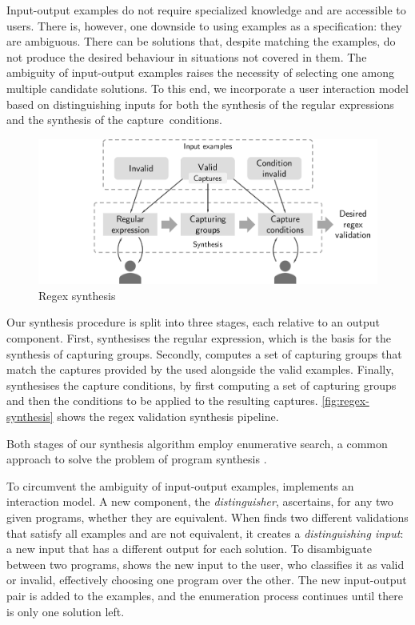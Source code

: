 Input-output examples do not require specialized knowledge and are accessible to users.
There is, however, one downside to using examples as a specification: they are ambiguous. There can be solutions that, despite matching the examples, do not produce the desired behaviour in situations not covered in them.
The ambiguity of input-output examples raises the necessity of selecting one among multiple candidate solutions.
%
To this end, we incorporate a user interaction model based on distinguishing inputs
for both the synthesis of the regular expressions and the synthesis of the capture~conditions. 

\begin{figure}
    \centering
    \includegraphics[scale=.35]{pictures/regex_synthesis_h.pdf}
    \caption{Regex synthesis}
    \label{fig:regex-synthesis}
\end{figure}

Our synthesis procedure is split into three stages, each relative to an output component. %
First, \Forest synthesises the regular expression, which is the basis for the synthesis of capturing groups.
Secondly, \Forest computes a set of capturing groups that match the captures provided by the used alongside the valid examples.
Finally, \Forest synthesises the capture conditions, by first computing a set of capturing groups and then the conditions to be applied to the resulting captures.
\autoref{fig:regex-synthesis} shows the regex validation synthesis pipeline.

Both stages of our synthesis algorithm employ enumerative search, a common approach to solve the problem of program synthesis \cite{DBLP:conf/pldi/FengMBD18,DBLP:conf/pldi/FengMGDC17,AlphaRegex16,Orvalho19,DBLP:conf/cav/ReynoldsBNBT19}.


To circumvent the ambiguity of input-output examples,
\Forest{} implements an interaction model.
A new component, the \textit{distinguisher}, ascertains, for any two given programs, whether they are equivalent.
When \Forest finds two different validations that satisfy all examples and are not equivalent, it creates a \textit{distinguishing input}: a new input that has a different output for each solution.
%
To disambiguate between two programs,
\Forest shows the new input to the user, who classifies it as valid or invalid, effectively choosing one program over the other.
%
The new input-output pair is added to the examples, and the enumeration process continues until there is only one solution left.


